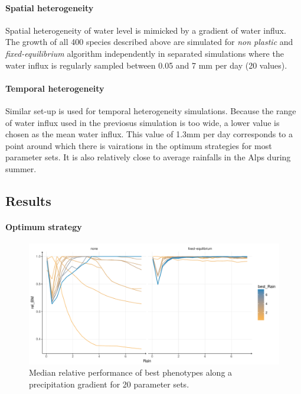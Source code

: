 \paragraph{Spatial heterogeneity}
Spatial heterogeneity of water level is mimicked by a gradient of water influx. The growth of all 400 species described above are simulated for \textit{non plastic} and \textit{fixed-equilibrium} algorithm independently in separated simulations where the water influx is regularly sampled between 0.05 and 7 mm per day (20 values).

\paragraph{Temporal heterogeneity}
Similar set-up is used for temporal heterogeneity simulations. Because the range of water influx used in the previosus simulation is too wide, a lower value is chosen as the mean water influx. This value of 1.3mm per day corresponds to a point around which there is vairations in the optimum strategies for most parameter sets. It is also relatively close to average rainfalls in the Alps during summer. 

\subsection{Results}

\paragraph{Optimum strategy}

\begin{figure}\label{fig:gradient_ranking}
\includegraphics[width = \textwidth]{./2_PP/Figures/Rain/optimum_shifting_median.pdf}
\caption{Median relative performance of best phenotypes along a precipitation gradient for 20 parameter sets.}
\end{figure}

